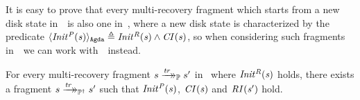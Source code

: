 It is easy to prove that every multi-recovery fragment which starts from a new disk state in~\Prog\ is also one in~\ProgInv, where a new disk state is characterized by the predicate $\langle \mathit{Init^P(s)} \rangle_\mathtt{Agda} {}\triangleq{} \mathit{Init^R(s)} \land \mathit{CI(s)}$, so when considering such fragments in~\Prog\ we can work with~\ProgInv\ instead.
\begin{lemma}
For every multi-recovery fragment $s \xrightarrow{\mathit{tr}}\mathrel{\mkern-14mu}\rightarrow_{\mathbb P} s'$ in \Prog\ where $\mathit{Init^R(s)}$ holds, there exists a fragment $s \xrightarrow{\mathit{tr}}\mathrel{\mkern-14mu}\rightarrow_{\mathbb P^\dagger} s'$ such that $\mathit{Init^P(s)}$, $\mathit{CI(s)}$ and $\mathit{RI(s')}$ hold.
\end{lemma}


